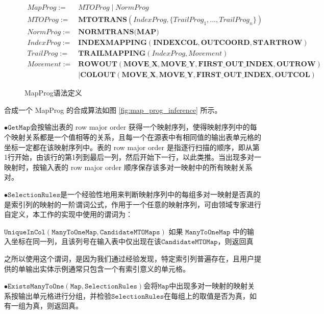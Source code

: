 \documentclass[design, pageheader]{njubachelor}
\begin{document}
\begin{figure}[!htbp]
    \begin{ttmath}
    \begin{align*} 
MapProg := & MTOProg \mid NormProg \\
MTOProg := & {\textbf {MTOTRANS}}({IndexProg, \{TrailProg_{1}, ..., TrailProg_{n}\}}) \\
NormProg := & {\textbf {NORMTRANS(MAP)}} \\
IndexProg := & \textbf {INDEXMAPPING}(\textbf{INDEXCOL}, \textbf{OUTCOORD}, \textbf{STARTROW}) \\
TrailProg := & {\textbf {TRAILMAPPING}}(IndexProg, Movement) \\
Movement := & \textbf {ROWOUT}(\textbf{MOVE\_X}, \textbf{MOVE\_Y}, \textbf{FIRST\_OUT\_INDEX}, \textbf{OUTROW}) \\ &\mid \textbf{COLOUT}(\textbf{MOVE\_X}, \textbf{MOVE\_Y}, \textbf{FIRST\_OUT\_INDEX}, \textbf{OUTCOL})
    \end{align*}
\end{ttmath}
    \caption{MapProg语法定义}
    \label{fig:map_prog} 
\end{figure}

合成一个 MapProg 的合成算法如图 \ref{fig:map_prog_inference} 所示。

$\bullet \mathtt{GetMap}$会按输出表的 row major order 获得一个映射序列，使得映射序列中的每个映射关系都是一个值相等的关系，且每一个在源表中有相同值的输出表单元格的坐标一定都在该映射序列中。表的 row major order 是指逐行扫描的顺序，即从第1行开始，由该行的第1列到最后一列，然后开始下一行，以此类推。当出现多对一映射时，按输入表的 row major order 顺序保存该多对一映射中的所有映射关系对。

$\bullet \mathtt{SelectionRules}$是一个经验性地用来判断映射序列中的每组多对一映射是否真的是索引列的映射的一阶谓词公式，作用于一个任意的映射序列，可由领域专家进行自定义，本工作的实现中使用的谓词为：

$\mathtt{UniqueInCol(ManyToOneMap, CandidateMTOMaps)}$ 如果 $\mathtt{ManyToOneMap}$ 中的输入坐标在同一列，且该列号在输入表中仅出现在该$\mathtt{CandidateMTOMap}$，则返回真

之所以使用这个谓词，是因为我们通过经验发现，特定索引列普遍存在，且用户提供的单输出实体示例通常只包含一个有索引意义的单元格。

$\bullet \mathtt{ExistsManyToOne(Map, SelectionRules)}$会将$\mathtt{Map}$中出现多对一映射的映射关系按输出单元格进行分组，并检验$\mathtt{SelectionRules}$在每组上的取值是否为真，如有一组为真，则返回真。
\end{document}
